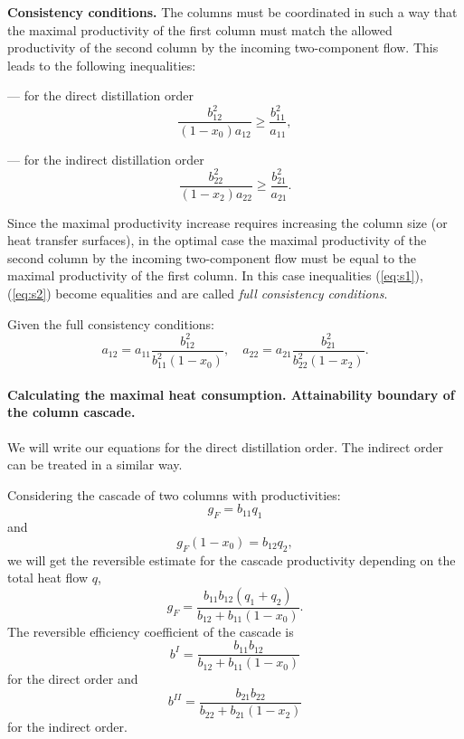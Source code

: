 \documentclass[12pt]{article}
\begin{document}
\textbf {Consistency conditions.}
The columns must be coordinated in such a way that the maximal productivity of the first column must match the allowed productivity of the second column by the incoming two-component flow. This leads to the following inequalities:

--- for the direct distillation order
\begin{equation}
\frac{b_{12}^2}{(1-x_0)a_{12}} \geq \frac{b_{11}^2}{a_{11}},
\label{eq:s1}
\end{equation}


--- for the indirect distillation order
\begin{equation}
\frac{b_{22}^2}{(1-x_2)a_{22}} \geq \frac{b_{21}^2}{a_{21}}.
\label{eq:s2}
\end{equation}

Since the maximal productivity increase requires increasing the column size (or heat transfer surfaces), in the optimal case the maximal productivity of the second column by the incoming two-component flow must be equal to the maximal productivity of the first column. In this case inequalities (\ref{eq:s1}), (\ref{eq:s2}) become equalities and are called \textit{full consistency conditions}.

Given the full consistency conditions:
\begin{equation}
a_{12} = a_{11}\frac{b_{12}^2}{b_{11}^2(1-x_0)},\quad a_{22} = a_{21}\frac{b_{21}^2}{b_{22}^2(1-x_2)}.
\label{eq:s3}
\end{equation}

\paragraph{Calculating the maximal heat consumption. Attainability boundary of the column cascade.}

We will write our equations for the direct distillation order. The indirect order can be treated in a similar way. 

Considering the cascade of two columns with productivities:
\begin{equation}
g_F = b_{11} q_1
\end{equation}
and
\begin{equation}
g_F(1-x_0) = b_{12} q_2,
\end{equation}
we will get the reversible estimate for the cascade productivity depending on the total heat flow $q$,
\begin{equation}
g_F = \frac{b_{11}b_{12}(q_1+q_2)}{b_{12}+b_{11}(1-x_0)}.
\label{eq:casc-r}
\end{equation}
The reversible efficiency coefficient of the cascade is
\begin{equation}
b^I = \frac{b_{11}b_{12}}{b_{12}+b_{11}(1-x_0)}
\label{eq:b-casc}
\end{equation}
for the direct order and
\begin{equation}
b^{II} = \frac{b_{21}b_{22}}{b_{22}+b_{21}(1-x_2)}
\label{eq:b-casc2}
\end{equation}
for the indirect order.
\end{document}

